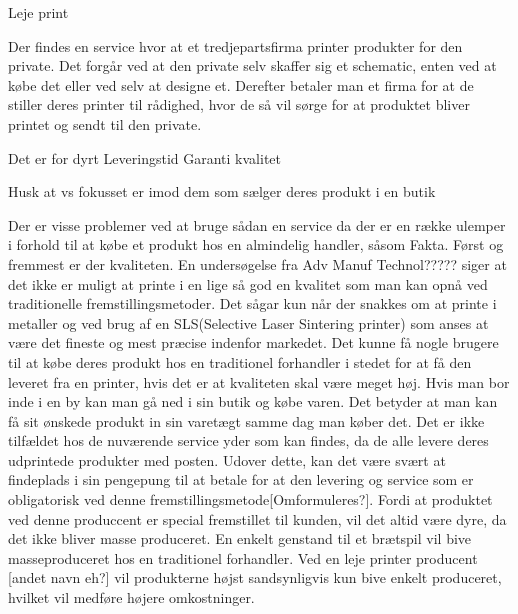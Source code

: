 Leje print

Der findes en service hvor at et tredjepartsfirma printer produkter for den private. Det forgår ved at den private selv skaffer sig et schematic, enten ved at købe det eller ved selv at designe et. Derefter betaler man et firma for at de stiller deres printer til rådighed, hvor de så vil sørge for at produktet bliver printet og sendt til den private.

Det er for dyrt
Leveringstid
Garanti kvalitet

Husk at vs fokusset er imod dem som sælger deres produkt i en butik

Der er visse problemer ved at bruge sådan en service da der er en række ulemper i forhold til at købe et produkt hos en almindelig handler, såsom Fakta. Først og fremmest er der kvaliteten. En undersøgelse fra Adv Manuf Technol????? siger at det ikke er muligt at printe i en lige så god en kvalitet som man kan opnå ved traditionelle fremstillingsmetoder. Det sågar kun når der snakkes om at printe i metaller og ved brug af en SLS(Selective Laser Sintering printer) som anses at være det fineste og mest præcise indenfor markedet. Det kunne få nogle brugere til at købe deres produkt hos en traditionel forhandler i stedet for at få den leveret fra en printer, hvis det er at kvaliteten skal være meget høj.
Hvis man bor inde i en by kan man gå ned i sin butik og købe varen. Det betyder at man kan få sit ønskede produkt in sin varetægt samme dag man køber det. Det er ikke tilfældet hos de nuværende service yder som kan findes, da de alle levere deres udprintede produkter med posten.
Udover dette, kan det være svært at findeplads i sin pengepung til at betale for at den levering og service som er obligatorisk ved denne fremstillingsmetode[Omformuleres?]. Fordi at produktet ved denne produccent er special fremstillet til kunden, vil det altid være dyre, da det ikke bliver masse produceret. En enkelt genstand til et brætspil vil bive masseproduceret hos en traditionel forhandler. Ved en leje printer producent [andet navn eh?] vil produkterne højst sandsynligvis kun bive enkelt produceret, hvilket vil medføre højere omkostninger. 